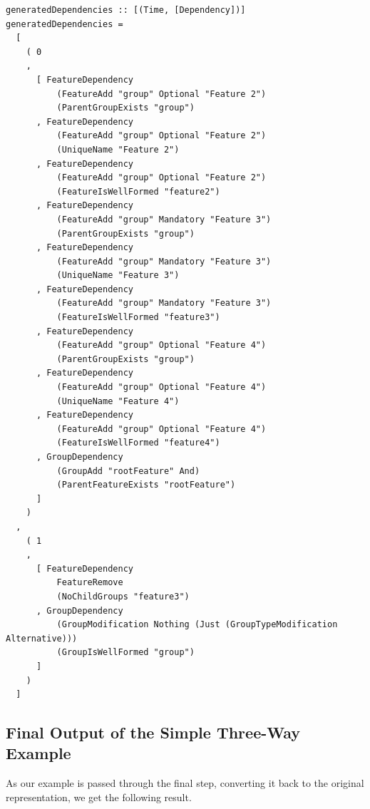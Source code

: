 \documentclass[a4paper,english]{ifimaster}
\begin{document}
\begin{verbatim}
generatedDependencies :: [(Time, [Dependency])]
generatedDependencies =
  [
    ( 0
    ,
      [ FeatureDependency
          (FeatureAdd "group" Optional "Feature 2")
          (ParentGroupExists "group")
      , FeatureDependency
          (FeatureAdd "group" Optional "Feature 2")
          (UniqueName "Feature 2")
      , FeatureDependency
          (FeatureAdd "group" Optional "Feature 2")
          (FeatureIsWellFormed "feature2")
      , FeatureDependency
          (FeatureAdd "group" Mandatory "Feature 3")
          (ParentGroupExists "group")
      , FeatureDependency
          (FeatureAdd "group" Mandatory "Feature 3")
          (UniqueName "Feature 3")
      , FeatureDependency
          (FeatureAdd "group" Mandatory "Feature 3")
          (FeatureIsWellFormed "feature3")
      , FeatureDependency
          (FeatureAdd "group" Optional "Feature 4")
          (ParentGroupExists "group")
      , FeatureDependency
          (FeatureAdd "group" Optional "Feature 4")
          (UniqueName "Feature 4")
      , FeatureDependency
          (FeatureAdd "group" Optional "Feature 4")
          (FeatureIsWellFormed "feature4")
      , GroupDependency
          (GroupAdd "rootFeature" And)
          (ParentFeatureExists "rootFeature")
      ]
    )
  ,
    ( 1
    ,
      [ FeatureDependency
          FeatureRemove
          (NoChildGroups "feature3")
      , GroupDependency
          (GroupModification Nothing (Just (GroupTypeModification Alternative)))
          (GroupIsWellFormed "group")
      ]
    )
  ]
\end{verbatim}

\subsection{Final Output of the Simple Three-Way Example}%
\label{sub:final_output_of_the_simple_three_way_example}

As our example is passed through the final step, converting it back to the original representation, we get the following result.
\end{document}
